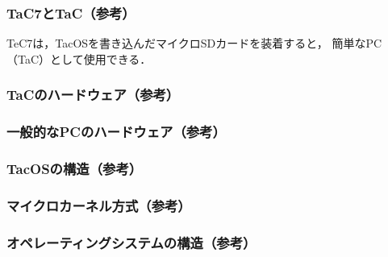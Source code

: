 \documentclass{beamer}                   %
\begin{document}
\begin{frame}
  \frametitle{TaC7とTaC（参考）}
  \begin{minipage}{0.58\columnwidth}
  \end{minipage}
  \begin{minipage}{0.38\columnwidth}
  \end{minipage}
\vfill
TeC7は，TacOSを書き込んだマイクロSDカードを装着すると，
簡単なPC（TaC）として使用できる．
\end{frame}

\begin{frame}
  \frametitle{TaCのハードウェア（参考）}
\end{frame}

\begin{frame}
  \frametitle{一般的なPCのハードウェア（参考）}
\end{frame}

\begin{frame}
  \frametitle{TacOSの構造（参考）}
\end{frame}

\begin{frame}
  \frametitle{マイクロカーネル方式（参考）}
\end{frame}

\begin{frame}
  \frametitle{オペレーティングシステムの構造（参考）}
\end{frame}
\end{document}
